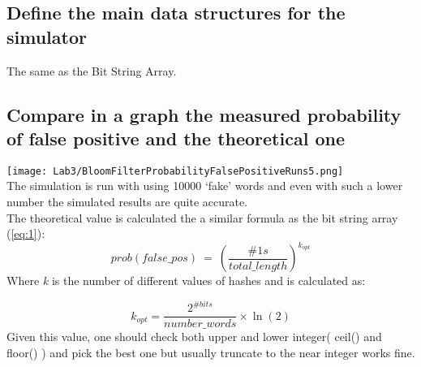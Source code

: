 \documentclass[twocolumn,letterpaper]{report}
\begin{document}
{			\subsection{Define the main data structures for the simulator}
						The same as the Bit String Array.
					
			\subsection{Compare in a graph the measured probability of false positive and the theoretical one}
			\texttt{[image: Lab3/BloomFilterProbabilityFalsePositiveRuns5.png]} \\
			The simulation is run with using 10000 `fake' words and even with such a lower number the simulated results are quite accurate. \\
			The theoretical value is calculated the a similar formula as the bit string array (\ref{eq:1}):
			\begin{equation} \label{eq:2}
				prob(false\_pos) \: = \: \left( \frac{\#1s}{total\_length} \right)^{k_{opt}}
			\end{equation}
			Where \emph{k} is the number of different values of hashes and is calculated as: 
			
			\begin{equation} \label{eq:3}
					k_{opt} = \frac {2^{\#bits}}{number\_words} \times \ln(2)
			\end{equation}
			Given this value, one should check both upper and lower integer( ceil() and floor() ) and pick the best one but usually truncate to the near integer works fine.
			
			
			\newpage 
			
}
\end{document}
